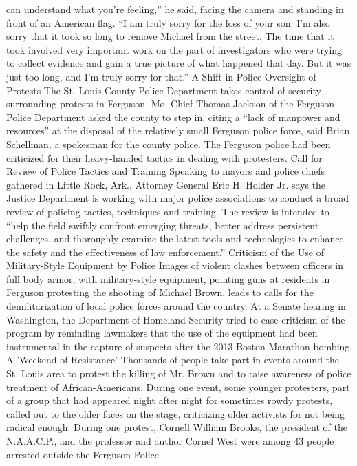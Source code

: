 can understand what you're feeling,'' he said, facing the camera and
standing in front of an American flag. ``I am truly sorry for the loss
of your son. I'm also sorry that it took so long to remove Michael from
the street. The time that it took involved very important work on the
part of investigators who were trying to collect evidence and gain a
true picture of what happened that day. But it was just too long, and
I'm truly sorry for that.'' A Shift in Police Oversight of Protests The
St. Louis County Police Department takes control of security surrounding
protests in Ferguson, Mo. Chief Thomas Jackson of the Ferguson Police
Department asked the county to step in, citing a ``lack of manpower and
resources'' at the disposal of the relatively small Ferguson police
force, said Brian Schellman, a spokesman for the county police. The
Ferguson police had been criticized for their heavy-handed tactics in
dealing with protesters. Call for Review of Police Tactics and Training
Speaking to mayors and police chiefs gathered in Little Rock, Ark.,
Attorney General Eric H. Holder Jr. says the Justice Department is
working with major police associations to conduct a broad review of
policing tactics, techniques and training. The review is intended to
``help the field swiftly confront emerging threats, better address
persistent challenges, and thoroughly examine the latest tools and
technologies to enhance the safety and the effectiveness of law
enforcement.'' Criticism of the Use of Military-Style Equipment by
Police Images of violent clashes between officers in full body armor,
with military-style equipment, pointing guns at residents in Ferguson
protesting the shooting of Michael Brown, leads to calls for the
demilitarization of local police forces around the country. At a Senate
hearing in Washington, the Department of Homeland Security tried to ease
criticism of the program by reminding lawmakers that the use of the
equipment had been instrumental in the capture of suspects after the
2013 Boston Marathon bombing. A 'Weekend of Resistance' Thousands of
people take part in events around the St. Louis area to protest the
killing of Mr. Brown and to raise awareness of police treatment of
African-Americans. During one event, some younger protesters, part of a
group that had appeared night after night for sometimes rowdy protests,
called out to the older faces on the stage, criticizing older activists
for not being radical enough. During one protest, Cornell William
Brooks, the president of the N.A.A.C.P., and the professor and author
Cornel West were among 43 people arrested outside the Ferguson Police

